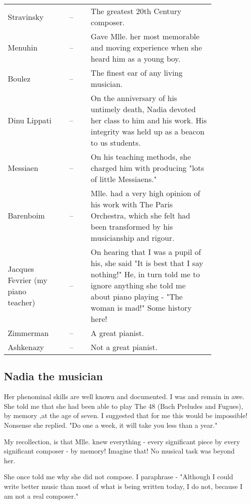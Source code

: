 \documentclass{article}
\begin{document}
\begin{tabular}{p{0.25\linewidth}cp{0.6\linewidth}}
    Stravinsky                         & -- & The greatest 20th Century composer.\\
    Menuhin                            & -- & Gave Mlle. her most memorable and moving experience when she heard him as a young boy.\\
    Boulez                             & -- & The finest ear of any living musician.\\
    Dinu Lippati                       & -- & On the anniversary of his untimely death, Nadia devoted her class to him and his work. His integrity was held up as a beacon to us students.\\
    Messiaen                           & -- & On his teaching methods, she charged him with producing "lots of little Messiaens."\\
    Barenboim                          & -- & Mlle. had a very high opinion of his work with The Paris Orchestra, which she felt had been transformed by his musicianship and rigour.\\
    Jacques Fevrier (my piano teacher) & -- & On hearing that I was a pupil of his, she said "It is best that I say nothing!" He, in turn told me to ignore anything she told me about piano playing - "The woman is mad!" Some history here!\\
    Zimmerman                          & -- & A great pianist.\\
    Ashkenazy                          & -- & Not a great pianist.\\
\end{tabular}

\subsection{Nadia the musician}

Her phenominal skills are well known and documented.
I was and remain in awe.
She told me that she had been able to play The 48 (Bach Preludes and Fugues), by memory ,at the age of seven.
I suggested that for me this would be impossible!
Nonsense she replied.
"Do one a week, it will take you less than a year."

My recollection, is that Mlle.
knew everything - every significant piece by every significant composer - by memory! Imagine that! No musical task was beyond her.

She once told me why she did not compose.
I paraphrase - "Although I could write better music than most of what is being written today, I do not, because I am not a real composer."
\end{document}
